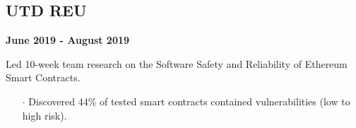 \documentclass[10pt]{article}
\begin{document}
\vspace{-.4cm}

\begin{paracol}{2}
    \begin{leftcolumn} 
        \sloppy
        \subsection*{UTD REU}
        \textbf{June 2019 - August 2019}
    \end{leftcolumn}
    \begin{rightcolumn} 
        \vspace{.2cm}
        \begin{flushleft} 
            Led 10-week team research on the Software Safety and Reliability of Ethereum Smart Contracts.
        \end{flushleft}
        \vspace{-.6cm}
        \begin{itemize}[leftmargin=.28cm, itemsep=1pt]
            \item[$\cdot$]  Discovered 44\% of tested smart contracts contained vulnerabilities (low to high risk).
        \end{itemize}
    \end{rightcolumn}
\end{paracol}
\end{document}
